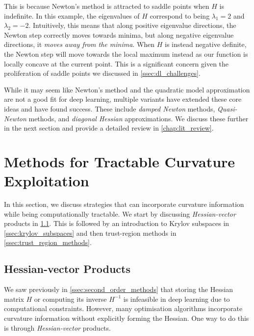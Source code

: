 This is because Newton's method is attracted to saddle points when $H$ is indefinite. In this example, the eigenvalues of $H$ correspond to being $\lambda_1 = 2$ and $\lambda_2 = -2$. Intuitively, this means that along positive eigenvalue directions, the Newton step correctly moves towards minima, but along negative eigenvalue directions, it \textit{moves away from the minima}. When $H$ is instead negative definite, the Newton step will move towards the local maximum instead as our function is locally concave at the current point. This is a significant concern given the proliferation of saddle points we discussed in \cref{ssec:dl_challenges}. 

While it may seem like Newton's method and the quadratic model approximation are not a good fit for deep learning, multiple variants have extended these core ideas and have found success. These include \textit{damped Newton} methods, \textit{Quasi-Newton} methods, and \textit{diagonal Hessian} approximations. We discuss these further in the next section and provide a detailed review in \cref{chap:lit_review}.

\section{Methods for Tractable Curvature Exploitation}
\label{sec:tractable_curvature_exploitation}

In this section, we discuss strategies that can incorporate curvature information while being computationally tractable. We start by discussing \textit{Hessian-vector} products in \cref{ssec:hessian_vector_products}. This is followed by an introduction to Krylov subspaces in \cref{ssec:krylov_subspaces} and then trust-region methods in \cref{ssec:trust_region_methods}.

\subsection{Hessian-vector Products}
\label{ssec:hessian_vector_products}

We saw previously in \cref{ssec:second_order_methods} that storing the Hessian matrix $H$ or computing its inverse $H^{-1}$ is infeasible in deep learning due to computational constraints. However, many optimisation algorithms incorporate curvature information without explicitly forming the Hessian. One way to do this is through \textit{Hessian-vector} products.

